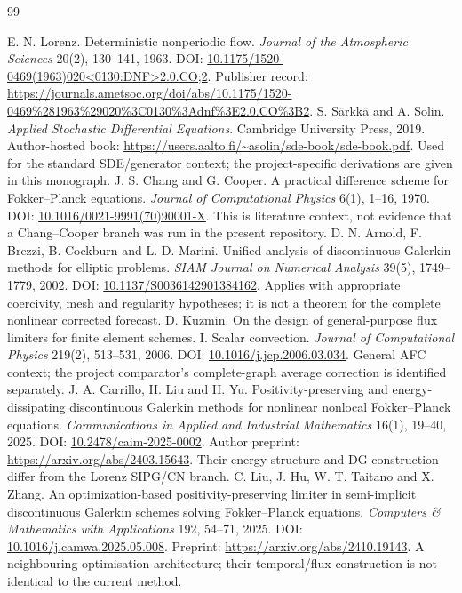 \begin{thebibliography}{99}
 E. N. Lorenz. Deterministic nonperiodic flow. \emph{Journal of the Atmospheric Sciences} 20(2), 130--141, 1963. DOI: \href{https://doi.org/10.1175/1520-0469(1963)020%3C0130:DNF%3E2.0.CO;2}{10.1175/1520-0469(1963)020\textless0130:DNF\textgreater2.0.CO;2}. Publisher record: \url{https://journals.ametsoc.org/doi/abs/10.1175/1520-0469%281963%29020%3C0130%3Adnf%3E2.0.CO%3B2}.
 S. S\"arkk\"a and A. Solin. \emph{Applied Stochastic Differential Equations}. Cambridge University Press, 2019. Author-hosted book: \url{https://users.aalto.fi/~asolin/sde-book/sde-book.pdf}. Used for the standard SDE/generator context; the project-specific derivations are given in this monograph.
 J. S. Chang and G. Cooper. A practical difference scheme for Fokker--Planck equations. \emph{Journal of Computational Physics} 6(1), 1--16, 1970. DOI: \href{https://doi.org/10.1016/0021-9991(70)90001-X}{10.1016/0021-9991(70)90001-X}. This is literature context, not evidence that a Chang--Cooper branch was run in the present repository.
 D. N. Arnold, F. Brezzi, B. Cockburn and L. D. Marini. Unified analysis of discontinuous Galerkin methods for elliptic problems. \emph{SIAM Journal on Numerical Analysis} 39(5), 1749--1779, 2002. DOI: \href{https://doi.org/10.1137/S0036142901384162}{10.1137/S0036142901384162}. Applies with appropriate coercivity, mesh and regularity hypotheses; it is not a theorem for the complete nonlinear corrected forecast.
 D. Kuzmin. On the design of general-purpose flux limiters for finite element schemes. I. Scalar convection. \emph{Journal of Computational Physics} 219(2), 513--531, 2006. DOI: \href{https://doi.org/10.1016/j.jcp.2006.03.034}{10.1016/j.jcp.2006.03.034}. General AFC context; the project comparator's complete-graph average correction is identified separately.
 J. A. Carrillo, H. Liu and H. Yu. Positivity-preserving and energy-dissipating discontinuous Galerkin methods for nonlinear nonlocal Fokker--Planck equations. \emph{Communications in Applied and Industrial Mathematics} 16(1), 19--40, 2025. DOI: \href{https://doi.org/10.2478/caim-2025-0002}{10.2478/caim-2025-0002}. Author preprint: \url{https://arxiv.org/abs/2403.15643}. Their energy structure and DG construction differ from the Lorenz SIPG/CN branch.
 C. Liu, J. Hu, W. T. Taitano and X. Zhang. An optimization-based positivity-preserving limiter in semi-implicit discontinuous Galerkin schemes solving Fokker--Planck equations. \emph{Computers \& Mathematics with Applications} 192, 54--71, 2025. DOI: \href{https://doi.org/10.1016/j.camwa.2025.05.008}{10.1016/j.camwa.2025.05.008}. Preprint: \url{https://arxiv.org/abs/2410.19143}. A neighbouring optimisation architecture; their temporal/flux construction is not identical to the current method.

\end{thebibliography}
